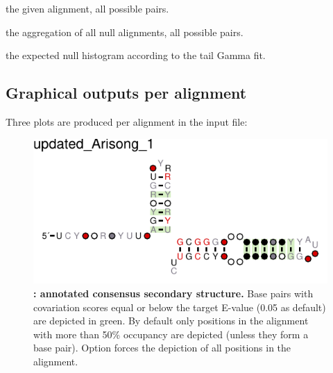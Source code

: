 \begin{sreitems}{}
\item[\prog{First histogram}] the given alignment, all possible pairs.
\item[\prog{Second histogram}] the aggregation of all null alignments, all possible pairs.
\item[\prog{Third histogram}] the expected null histogram according to the tail Gamma fit.
\end{sreitems}


\subsection{Graphical outputs per alignment}
Three plots are produced per alignment in the input file: 

\begin{figure}
  \includegraphics[scale=1.5]{Arisong_R2R.pdf} 
\caption{\small\textbf{:
    annotated consensus secondary structure.} Base pairs with
  covariation scores equal or below the target E-value (0.05 as
  default) are depicted in green. By default only positions in the
  alignment with more than 50\% occupancy are depicted (unless they form
  a base pair). Option  forces the depiction of all
  positions in the alignment.  }
\label{fig:r2r}
\end{figure}

